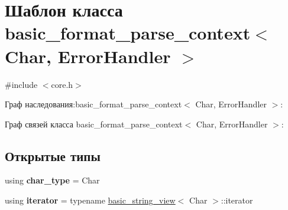 \hypertarget{classbasic__format__parse__context}{}\section{Шаблон класса basic\+\_\+format\+\_\+parse\+\_\+context$<$ Char, Error\+Handler $>$}
\label{classbasic__format__parse__context}


{\ttfamily \#include $<$core.\+h$>$}



Граф наследования\+:basic\+\_\+format\+\_\+parse\+\_\+context$<$ Char, Error\+Handler $>$\+:


Граф связей класса basic\+\_\+format\+\_\+parse\+\_\+context$<$ Char, Error\+Handler $>$\+:
\subsection*{Открытые типы}
\begin{DoxyCompactItemize}
\item 
\mbox{\label{classbasic__format__parse__context_a7a2176cf6ebe5a6308452674296c26f8}} 
using {\bfseries char\+\_\+type} = Char
\item 
\mbox{\label{classbasic__format__parse__context_a8467916453eb3312b2954418168c6cde}} 
using {\bfseries iterator} = typename \hyperlink{classbasic__string__view}{basic\+\_\+string\+\_\+view}$<$ Char $>$\+::iterator
\end{DoxyCompactItemize}
